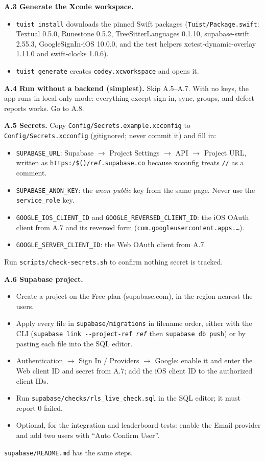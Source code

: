 \documentclass[12pt,letterpaper]{article}
\begin{document}
\textbf{A.3 Generate the Xcode workspace.}
\begin{itemize}
  \item \texttt{tuist install} downloads the pinned Swift packages
        (\texttt{Tuist/Package.swift}: Textual 0.5.0, Runestone 0.5.2,
        TreeSitterLanguages 0.1.10, supabase-swift 2.55.3, GoogleSignIn-iOS 10.0.0, and the
        test helpers xctest-dynamic-overlay 1.11.0 and swift-clocks 1.0.6).
  \item \texttt{tuist generate} creates \texttt{codey.xcworkspace} and opens it.
\end{itemize}

\textbf{A.4 Run without a backend (simplest).} Skip A.5--A.7. With no keys, the app
runs in local-only mode: everything except sign-in, sync, groups, and defect reports
works. Go to A.8.

\textbf{A.5 Secrets.} Copy \texttt{Config/Secrets.example.xcconfig} to
\texttt{Config/Secrets.xcconfig} (gitignored; never commit it) and fill in:
\begin{itemize}
  \item \texttt{SUPABASE\_URL}: Supabase $\to$ Project Settings $\to$ API $\to$ Project
        URL, written as \texttt{https:/\$()/\textit{ref}.supabase.co} because xcconfig
        treats \texttt{//} as a comment.
  \item \texttt{SUPABASE\_ANON\_KEY}: the \emph{anon public} key from the same page.
        Never use the \texttt{service\_role} key.
  \item \texttt{GOOGLE\_IOS\_CLIENT\_ID} and \texttt{GOOGLE\_REVERSED\_CLIENT\_ID}: the
        iOS OAuth client from A.7 and its reversed form
        (\texttt{com.googleusercontent.apps.\ldots}).
  \item \texttt{GOOGLE\_SERVER\_CLIENT\_ID}: the Web OAuth client from A.7.
\end{itemize}
Run \texttt{scripts/check-secrets.sh} to confirm nothing secret is tracked.

\textbf{A.6 Supabase project.}
\begin{itemize}
  \item Create a project on the Free plan (supabase.com), in the region nearest the
        users.
  \item Apply every file in \texttt{supabase/migrations} in filename order, either with
        the CLI (\texttt{supabase link -{}-project-ref \textit{ref}} then
        \texttt{supabase db push}) or by pasting each file into the SQL editor.
  \item Authentication $\to$ Sign In / Providers $\to$ Google: enable it and enter the
        Web client ID and secret from A.7; add the iOS client ID to the authorized
        client IDs.
  \item Run \texttt{supabase/checks/rls\_live\_check.sql} in the SQL editor; it must
        report 0 failed.
  \item Optional, for the integration and leaderboard tests: enable the Email provider
        and add two users with ``Auto Confirm User''.
\end{itemize}
\texttt{supabase/README.md} has the same steps.
\end{document}
